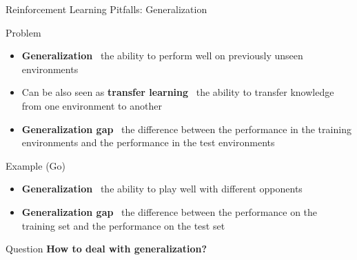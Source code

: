 \documentclass[presentation, 9pt]{beamer}\mode<presentation>{\usetheme{AMSBolognaFC}}
\begin{document}
\begin{frame}{Reinforcement Learning Pitfalls: Generalization}
\begin{block}{Problem}
	\begin{itemize}
		\item \textbf{Generalization} \faArrowRight \, the ability to perform well on previously unseen environments
		\item Can be also seen as \textbf{transfer learning} \faArrowRight \, the ability to transfer knowledge from one environment to another
		\item \textbf{Generalization gap} \faArrowRight \, the difference between the performance in the training environments and the performance in the test environments
	\end{itemize}
\end{block}
\begin{block}{Example (Go) \, \href{}{\faLink}}
	\begin{itemize}
		\item \textbf{Generalization} \faArrowRight \, the ability to play well with different opponents
		\item \textbf{Generalization gap} \faArrowRight \, the difference between the performance on the training set and the performance on the test set
	\end{itemize}
\end{block}
\begin{alertblock}{Question}
	\centering
	\textbf{How to deal with generalization?}
\end{alertblock}
\end{frame}
\end{document}
